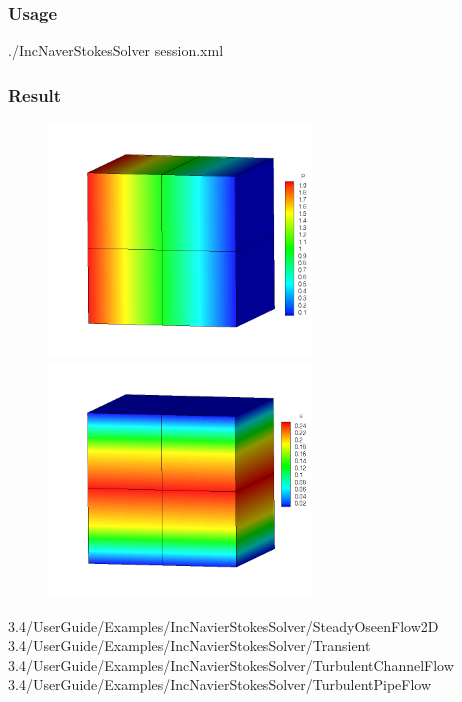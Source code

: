 \subsubsection{Usage}
./IncNaverStokesSolver session.xml

\subsubsection{Result}

\begin{figure}
\includegraphics[width=7cm]{Figures/CF3DCVP3PR.png}
\includegraphics[width=7cm]{Figures/CF3DCVP3.png}
\end{figure}









3.4/UserGuide/Examples/IncNavierStokesSolver/SteadyOseenFlow2D
3.4/UserGuide/Examples/IncNavierStokesSolver/Transient
3.4/UserGuide/Examples/IncNavierStokesSolver/TurbulentChannelFlow
3.4/UserGuide/Examples/IncNavierStokesSolver/TurbulentPipeFlow

